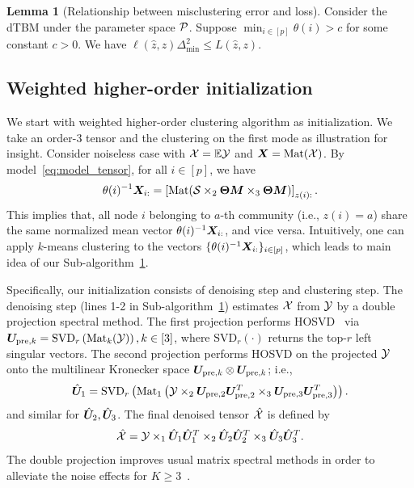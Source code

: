 \documentclass[journal]{IEEEtran}
\theoremstyle{definition}
\newtheorem{lem}{Lemma}
\theoremstyle{definition}
\newcommand{\of}[1]{\left(#1\right)}
\newcommand{\off}[1]{\left[#1\right]}
\def\fixme#1#2{\textbf{\color{red}[FIXME (#1): #2]}}
\begin{document}
\begin{lem}[Relationship between misclustering error and loss]\label{lem:mis} {Consider the dTBM under the parameter space $\mathcal{P}$.} Suppose $\min_{i \in [p]}\theta(i) > c$ for some constant $c > 0$. We have $\ell(\hat z, z) \Delta_{\min}^2 \leq L(\hat z, z)$.
\end{lem}

\subsection{Weighted higher-order initialization}

We start with weighted higher-order clustering algorithm as initialization.   {We take an order-3 tensor and the clustering on the first mode as illustration for insight.} Consider noiseless case with $\mathcal{X} = \mathbb{E}\mathcal{Y}$ and $\bm X = \text{Mat}(\mathcal{X})$. 
By model~\eqref{eq:model_tensor}, for all $i \in [p]$, we have
\begin{equation}\label{eq:kmeans}
    \theta(i)^{-1} \mX_{i:} = \off{\text{Mat}( \tS \times_2 \mTheta \mM \times_3  \mTheta \mM )}_{z(i):}. 
\end{equation}
This implies that, all node $i$ belonging to $a$-th community (i.e., $z(i)=a$) share the same normalized mean vector $\theta(i)^{-1} \bm X_{i:}$, and vice versa. Intuitively, one can apply $k$-means clustering to the vectors $\{ \theta(i)^{-1} \bm X_{i:} \}_{i\in[p]}$, which leads to main idea of our Sub-algorithm~\hyperref[alg:main]{1}.  


Specifically, our initialization consists of denoising step and clustering step. The denoising step (lines 1-2 in Sub-algorithm~\hyperref[alg:main]{1}) estimates $\mathcal{X}$ from $\mathcal{Y}$ by a double projection spectral method.  
The first projection performs HOSVD~\citep{de2000multilinear} via $\mU_{\text{pre},k} = \text{SVD}_{r} \of{ \text{Mat}_k(\tY) }, k \in [3]$, where $\text{SVD}_r(\cdot)$ returns the top-$r$ left singular vectors. The second projection performs HOSVD on the projected $\mathcal{Y}$ onto the multilinear Kronecker space $\bm{U}_{\text{pre},k} \otimes  \bm{U}_{\text{pre},k}$; i.e.,
\begin{equation}\label{eq:two-step_factor}
    \hat \mU_1 = \text{SVD}_{r} \of{\text{Mat}_1\of{ \tY\times_2  \mU_{\text{pre},2} \mU_{\text{pre},2}^T \times_3   \mU_{\text{pre},3} \mU_{\text{pre},3}^T }}.
\end{equation}
and similar for $ \hat {\bm{U}}_2 ,  \hat {\bm{U}}_3 $.
The final denoised tensor $\hat {\mathcal{X}}$ is defined by
\begin{equation}\label{eq:two-step_est}
    \hat \tX = \tY \times_1 \hat \mU_1 \hat 
\mU^T_1 \times_2 \hat \mU_2 \hat \mU^T_2 \times_3 \hat \mU_3 \hat \mU^T_3. 
\end{equation}
The double projection improves usual matrix spectral methods in order to alleviate the noise effects for $K\geq 3$~\citep{han2020exact}.
\end{document}
